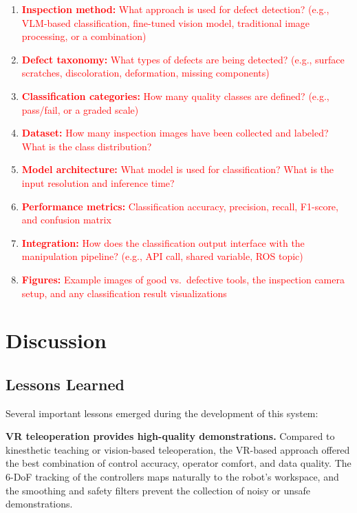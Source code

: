 \documentclass[conference]{IEEEtran}
\begin{document}
\begin{enumerate}
    \item \textcolor{red}{\textbf{Inspection method:} What approach is used for defect detection? (e.g., VLM-based classification, fine-tuned vision model, traditional image processing, or a combination)}
    \item \textcolor{red}{\textbf{Defect taxonomy:} What types of defects are being detected? (e.g., surface scratches, discoloration, deformation, missing components)}
    \item \textcolor{red}{\textbf{Classification categories:} How many quality classes are defined? (e.g., pass/fail, or a graded scale)}
    \item \textcolor{red}{\textbf{Dataset:} How many inspection images have been collected and labeled? What is the class distribution?}
    \item \textcolor{red}{\textbf{Model architecture:} What model is used for classification? What is the input resolution and inference time?}
    \item \textcolor{red}{\textbf{Performance metrics:} Classification accuracy, precision, recall, F1-score, and confusion matrix}
    \item \textcolor{red}{\textbf{Integration:} How does the classification output interface with the manipulation pipeline? (e.g., API call, shared variable, ROS topic)}
    \item \textcolor{red}{\textbf{Figures:} Example images of good vs.\ defective tools, the inspection camera setup, and any classification result visualizations}
\end{enumerate}

\section{Discussion}

\subsection{Lessons Learned}

Several important lessons emerged during the development of this system:

\textbf{VR teleoperation provides high-quality demonstrations.} Compared to kinesthetic teaching or vision-based teleoperation, the VR-based approach offered the best combination of control accuracy, operator comfort, and data quality. The 6-DoF tracking of the controllers maps naturally to the robot's workspace, and the smoothing and safety filters prevent the collection of noisy or unsafe demonstrations.
\end{document}
